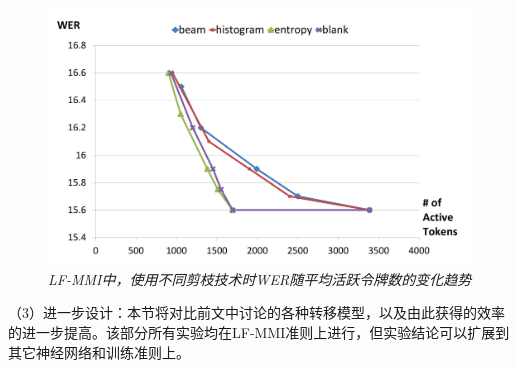  
\begin{figure}[tbhp!]
        \centering
        \includegraphics[width=\linewidth]{figure/prune-wer-at-gsm.pdf}
        \caption{{\it  LF-MMI中，使用不同剪枝技术时WER随平均活跃令牌数的变化趋势  }}
        \label{fig:prune-wer-at-gsm}
      \end{figure}
   
（3）进一步设计：本节将对比前文中讨论的各种转移模型，以及由此获得的效率的进一步提高。该部分所有实验均在LF-MMI准则上进行，但实验结论可以扩展到其它神经网络和训练准则上。 



